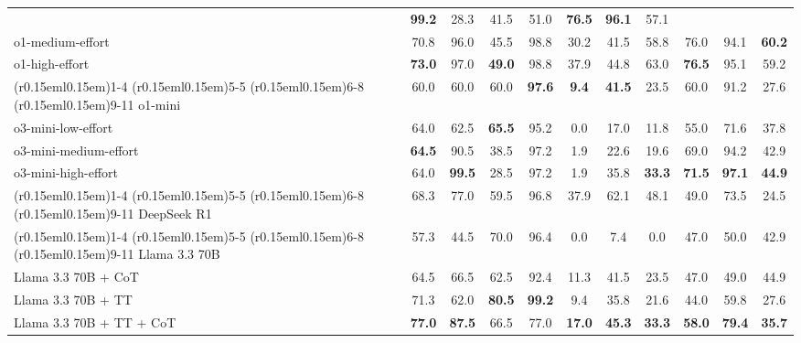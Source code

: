 \begin{table*}[t!]
\begin{adjustbox}{width=\linewidth}
\begin{tabular}{lccc|c|ccc|ccc}
    & \textbf{99.2} 
    & 28.3   & 41.5   & 51.0
    & \textbf{76.5}  & \textbf{96.1}     & 57.1 
    \\
    o1-medium-effort   
    & 70.8  & 96.0  & 45.5  
    & 98.8  
    & 30.2   & 41.5   & 58.8
    & 76.0  & 94.1     & \textbf{60.2}
    \\
    o1-high-effort     
    & \textbf{73.0}  & 97.0  & \textbf{49.0}
    & 98.8  
    & 37.9   & 44.8   & 63.0
    & \textbf{76.5}  & 95.1     & 59.2 
    \\
    \cmidrule(r{0.15em}l{0.15em}){1-4} \cmidrule(r{0.15em}l{0.15em}){5-5}  \cmidrule(r{0.15em}l{0.15em}){6-8}  \cmidrule(r{0.15em}l{0.15em}){9-11}
    o1-mini
    & 60.0  & 60.0  & 60.0
    & \textbf{97.6}
    & \textbf{9.4}   & \textbf{41.5}   & 23.5
    & 60.0  & 91.2     & 27.6
    \\
    o3-mini-low-effort
    & 64.0  & 62.5  & \textbf{65.5}
    & 95.2 
    & 0.0   & 17.0   & 11.8
    & 55.0  & 71.6   & 37.8
    \\
    o3-mini-medium-effort
    & \textbf{64.5}  & 90.5  & 38.5  
    & 97.2 
    & 1.9   & 22.6   & 19.6
    & 69.0  & 94.2   & 42.9
    \\
    o3-mini-high-effort
    & 64.0  & \textbf{99.5}  & 28.5  
    & 97.2  
    & 1.9   & 35.8   & \textbf{33.3}
    & \textbf{71.5}  & \textbf{97.1}   & \textbf{44.9}
    \\
    \cmidrule(r{0.15em}l{0.15em}){1-4} \cmidrule(r{0.15em}l{0.15em}){5-5}  \cmidrule(r{0.15em}l{0.15em}){6-8}  \cmidrule(r{0.15em}l{0.15em}){9-11}
    DeepSeek R1
    & 68.3  & 77.0  & 59.5 %
    & 96.8 
    & 37.9   & 62.1   & 48.1
    & 49.0     & 73.5     & 24.5
    \\
    \cmidrule(r{0.15em}l{0.15em}){1-4} \cmidrule(r{0.15em}l{0.15em}){5-5}  \cmidrule(r{0.15em}l{0.15em}){6-8}  \cmidrule(r{0.15em}l{0.15em}){9-11}
    Llama 3.3 70B      
    & 57.3  & 44.5  & 70.0  
    & 96.4 
    & 0.0   & 7.4   & 0.0
    & 47.0     & 50.0     & 42.9  
    \\
    Llama 3.3 70B + CoT
    & 64.5  & 66.5  & 62.5  
    & 92.4 
    & 11.3  & 41.5  & 23.5
    & 47.0  & 49.0  & 44.9
    \\
    Llama 3.3 70B + TT 
    & 71.3  & 62.0  & \textbf{80.5}
    & \textbf{99.2} 
    & 9.4   & 35.8  & 21.6
    & 44.0  & 59.8     & 27.6
    \\
    Llama 3.3 70B + TT + CoT
    & \textbf{77.0}  & \textbf{87.5}  & 66.5  
    & 77.0  
    & \textbf{17.0}  & \textbf{45.3}  & \textbf{33.3}
    & \textbf{58.0}     & \textbf{79.4}     & \textbf{35.7}

\end{tabular}
\end{adjustbox}
\end{table*}
